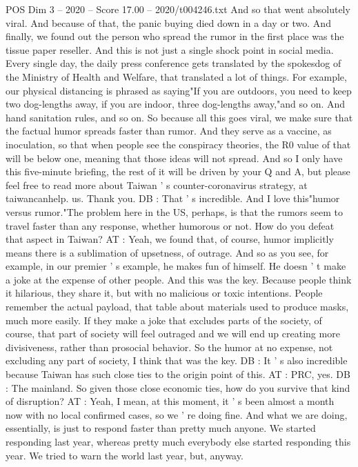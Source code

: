 \begin{textsample}{POS Dim 3 – 2020 – Score 17.00 – 2020/t004246.txt}
And so that went absolutely viral.
And because of that, the panic buying died down in a day or two.
And finally, we found out the person who spread the rumor in the first place was the tissue paper reseller.
And this is not just a single shock point in social media.
Every single day, the daily press conference gets translated by the spokesdog of the Ministry of Health and Welfare, that translated a lot of things.
For example, our physical distancing is phrased as saying"If you are outdoors, you need to keep two dog-lengths away, if you are indoor, three dog-lengths away,"and so on.
And hand sanitation rules, and so on.
So because all this goes viral, we make sure that the factual humor spreads faster than rumor.
And they serve as a vaccine, as inoculation, so that when people see the conspiracy theories, the R0 value of that will be below one, meaning that those ideas will not spread.
And so I only have this five-minute briefing, the rest of it will be driven by your Q and A, but please feel free to read more about Taiwan ' s counter-coronavirus strategy, at taiwancanhelp. us.
Thank you.
DB : That ' s incredible.
And I love this"humor versus rumor."The problem here in the US, perhaps, is that the rumors seem to travel faster than any response, whether humorous or not.
How do you defeat that aspect in Taiwan?
AT : Yeah, we found that, of course, humor implicitly means there is a sublimation of upsetness, of outrage.
And so as you see, for example, in our premier ' s example, he makes fun of himself.
He doesn ' t make a joke at the expense of other people.
And this was the key.
Because people think it hilarious, they share it, but with no malicious or toxic intentions.
People remember the actual payload, that table about materials used to produce masks, much more easily.
If they make a joke that excludes parts of the society, of course, that part of society will feel outraged and we will end up creating more divisiveness, rather than prosocial behavior.
So the humor at no expense, not excluding any part of society, I think that was the key.
DB : It ' s also incredible because Taiwan has such close ties to the origin point of this.
AT : PRC, yes.
DB : The mainland.
So given those close economic ties, how do you survive that kind of disruption?
AT : Yeah, I mean, at this moment, it ' s been almost a month now with no local confirmed cases, so we ' re doing fine.
And what we are doing, essentially, is just to respond faster than pretty much anyone.
We started responding last year, whereas pretty much everybody else started responding this year.
We tried to warn the world last year, but, anyway.

\end{textsample}

